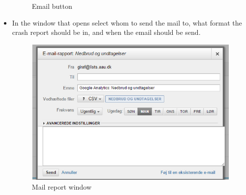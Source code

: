 \begin{itemize}
\begin{figure}[H]
			\caption{Email button}
			\label{Email}
		\end{figure}
	\item In the window that opens select whom to send the mail to, what format the crash report should be in, and when the email should be send.
		\begin{figure}[H]
			\includegraphics[width=0.8 \textwidth]{pictures/Maillist.png}
			\caption{Mail report window}
			\label{Maillist}
		\end{figure}
\end{itemize}
	